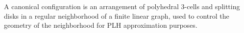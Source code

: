 A canonical configuration is an arrangement of polyhedral 3-cells and splitting disks in a regular neighborhood of a finite linear graph, used to control the geometry of the neighborhood for PLH approximation purposes.
